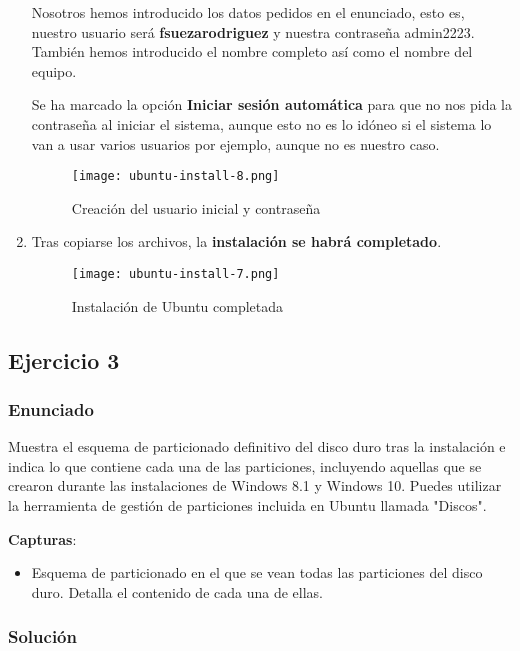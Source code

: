 \begin{enumerate}
    Nosotros hemos introducido los datos pedidos en el enunciado, esto es, nuestro usuario será \textbf{fsuezarodriguez} y nuestra contraseña {admin2223}. También hemos introducido el nombre completo así como el nombre del equipo.

    Se ha marcado la opción \textbf{Iniciar sesión automática} para que no nos pida la contraseña al iniciar el sistema, aunque esto no es lo idóneo si el sistema lo van a usar varios usuarios por ejemplo, aunque no es nuestro caso.

    \begin{figure}[H]
        \centering
        \texttt{[image: ubuntu-install-8.png]}
        \caption{Creación del usuario inicial y contraseña}
    \end{figure}

    \item Tras copiarse los archivos, la \textbf{instalación se habrá completado}.

    \begin{figure}[H]
        \centering
        \texttt{[image: ubuntu-install-7.png]}
        \caption{Instalación de Ubuntu completada}
    \end{figure}
\end{enumerate}

\subsection{Ejercicio 3}

\subsubsection{Enunciado}
Muestra el esquema de particionado definitivo del disco duro tras la instalación e indica lo que contiene cada una de las particiones, incluyendo aquellas que se crearon durante las instalaciones de Windows 8.1 y Windows 10. Puedes utilizar la herramienta de gestión de particiones incluida en Ubuntu llamada "Discos".

\textbf{Capturas}:
\begin{itemize}
    \item Esquema de particionado en el que se vean todas las particiones del disco duro. Detalla el contenido de cada una de ellas.
\end{itemize}

\subsubsection{Solución}

